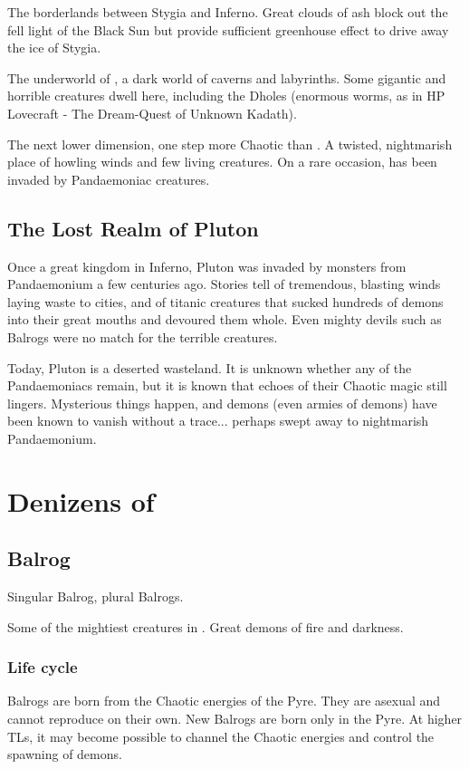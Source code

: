 The borderlands between Stygia and Inferno. Great clouds of ash block out the fell light of the Black Sun but provide sufficient greenhouse effect to drive away the ice of Stygia. 



The underworld of \Tuat{}, a dark world of caverns and labyrinths. Some gigantic and horrible creatures dwell here, including the Dholes (enormous worms, as in HP Lovecraft - The Dream-Quest of Unknown Kadath). 



The next lower dimension, one step more Chaotic than \Tuat{}. A twisted, nightmarish place of howling winds and few living creatures. On a rare occasion, \Tuat{} has been invaded by Pandaemoniac creatures. 

\subsection{The Lost Realm of Pluton}
Once a great kingdom in Inferno, Pluton was invaded by monsters from Pandaemonium a few centuries ago. Stories tell of tremendous, blasting winds laying waste to cities, and of titanic creatures that sucked hundreds of demons into their great mouths and devoured them whole. Even mighty devils such as Balrogs were no match for the terrible creatures. 

Today, Pluton is a deserted wasteland. It is unknown whether any of the Pandaemoniacs remain, but it is known that echoes of their Chaotic magic still lingers. Mysterious things happen, and demons (even armies of demons) have been known to vanish without a trace... perhaps swept away to nightmarish Pandaemonium. 

\section{Denizens of \Tuat{}}

\subsection{Balrog}
Singular Balrog, plural Balrogs. 

Some of the mightiest creatures in \Tuat{}. Great demons of fire and darkness. 

\subsubsection{Life cycle}
Balrogs are born from the Chaotic energies of the Pyre. They are asexual and cannot reproduce on their own. New Balrogs are born only in the Pyre. At higher TLs, it may become possible to channel the Chaotic energies and control the spawning of demons. 

